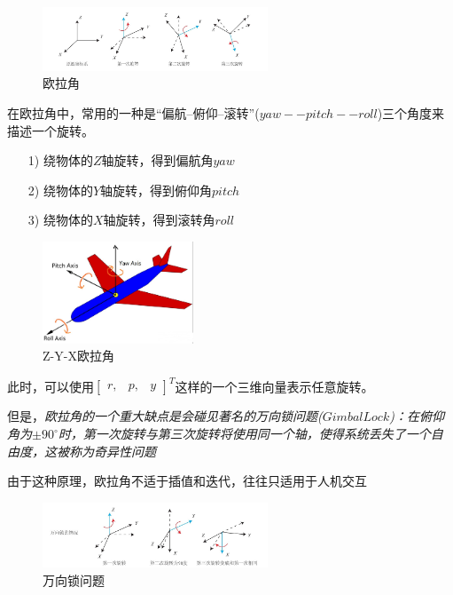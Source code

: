 \begin{figure}[!htbp]
    \centering
    \includegraphics[width=0.6\textwidth]{image/chapter02/欧拉角.png}
    \caption{欧拉角}
\end{figure}

    在欧拉角中，常用的一种是“偏航--俯仰--滚转”($yaw--pitch--roll$)三个角度来描述一个旋转。

\begin{itemize}
    \item [1)] 绕物体的$Z$轴旋转，得到偏航角$yaw$
    \item [2)] 绕物体的$Y$轴旋转，得到俯仰角$pitch$
    \item [3)] 绕物体的$X$轴旋转，得到滚转角$roll$
\end{itemize}
    
\begin{figure}[!htbp]
    \centering
    \includegraphics[width=0.4\textwidth]{image/chapter02/ZYX欧拉角.png}
    \caption{Z-Y-X欧拉角}
\end{figure}

    此时，可以使用$\begin{bmatrix}r, & p, & y \end{bmatrix}^T$这样的一个三维向量表示任意旋转。

    但是，\emph{欧拉角的一个重大缺点是会碰见著名的万向锁问题($Gimbal Lock$)：在俯仰角为$\pm90^{\circ}$时，第一次旋转与第三次旋转将使用同一个轴，使得系统丢失了一个自由度，这被称为奇异性问题}
    
    由于这种原理，欧拉角不适于插值和迭代，往往只适用于人机交互

\begin{figure}[!htbp]
    \centering
    \includegraphics[width=0.6\textwidth]{image/chapter02/万向锁.png}
    \caption{万向锁问题}
\end{figure}

